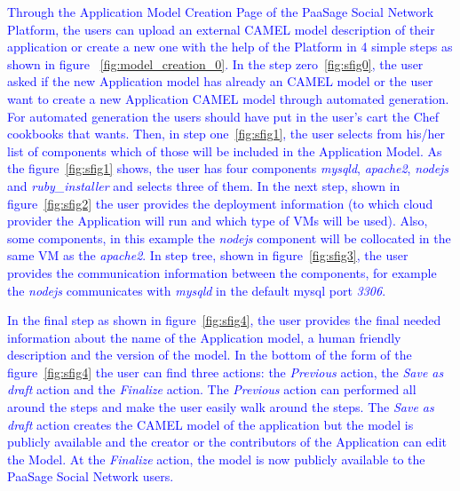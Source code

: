 \textcolor{blue}{Through the Application Model Creation Page of the PaaSage Social Network Platform, the users can upload an external CAMEL model description of their application or create a new one with the help of the Platform in 4 simple steps as shown in figure ~\ref{fig:model_creation_0}. In the step zero~\ref{fig:sfig0}, the user asked if the new Application model has already an CAMEL model or the user want to create a new Application CAMEL model through automated generation. For automated generation the users should have put in the user's cart the Chef cookbooks that wants. Then, in step one~\ref{fig:sfig1}, the user selects from his/her list of components which of those will be included in the Application Model. 
As the figure~\ref{fig:sfig1} shows, the user has four components {\it mysqld}, {\it apache2}, {\it nodejs} and 
{\it ruby\_installer} and selects three of them. In the next step, shown in figure~\ref{fig:sfig2} the user provides the deployment information (to which cloud provider the Application will run and which type of VMs will be used). Also, some components, in this example the {\it nodejs} component will be collocated in the same VM as the {\it apache2}. In step tree, shown in figure~\ref{fig:sfig3}, the user provides the communication information between the components, for example the 
{\it nodejs} communicates with {\it mysqld} in the default mysql port {\it 3306}.}

\textcolor{blue}{In the final step as shown in figure~\ref{fig:sfig4}, the user provides the final needed information about the name of the Application model, a human friendly description and the version of the model. In the bottom of the form of the figure~\ref{fig:sfig4} the user can find three actions: the \emph{Previous} action, the \emph{Save as draft} action and the \emph{Finalize} action. The \emph{Previous} action can performed all around the steps and make the user easily walk around the steps. The \emph{Save as draft} action creates the CAMEL model of the application but the model is publicly available and the creator or the contributors of the Application can edit the Model. At the \emph{Finalize} action, the model is now publicly available to the PaaSage Social Network users.}

